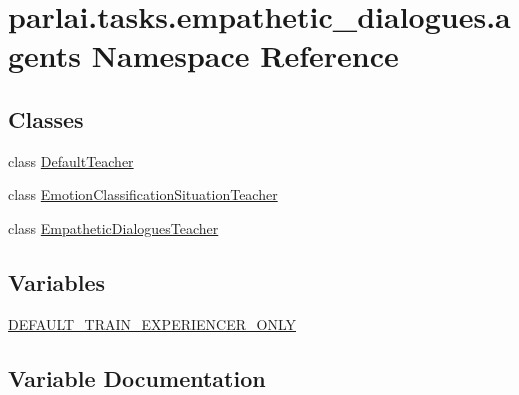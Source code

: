 \hypertarget{namespaceparlai_1_1tasks_1_1empathetic__dialogues_1_1agents}{}\section{parlai.\+tasks.\+empathetic\+\_\+dialogues.\+agents Namespace Reference}
\label{namespaceparlai_1_1tasks_1_1empathetic__dialogues_1_1agents}
\subsection*{Classes}
\begin{DoxyCompactItemize}
\item 
class \hyperlink{classparlai_1_1tasks_1_1empathetic__dialogues_1_1agents_1_1DefaultTeacher}{Default\+Teacher}
\item 
class \hyperlink{classparlai_1_1tasks_1_1empathetic__dialogues_1_1agents_1_1EmotionClassificationSituationTeacher}{Emotion\+Classification\+Situation\+Teacher}
\item 
class \hyperlink{classparlai_1_1tasks_1_1empathetic__dialogues_1_1agents_1_1EmpatheticDialoguesTeacher}{Empathetic\+Dialogues\+Teacher}
\end{DoxyCompactItemize}
\subsection*{Variables}
\begin{DoxyCompactItemize}
\item 
\hyperlink{namespaceparlai_1_1tasks_1_1empathetic__dialogues_1_1agents_a11d5c56abc0e847232f8b22d9a96d6f4}{D\+E\+F\+A\+U\+L\+T\+\_\+\+T\+R\+A\+I\+N\+\_\+\+E\+X\+P\+E\+R\+I\+E\+N\+C\+E\+R\+\_\+\+O\+N\+LY}
\end{DoxyCompactItemize}


\subsection{Variable Documentation}
\mbox{\label{namespaceparlai_1_1tasks_1_1empathetic__dialogues_1_1agents_a11d5c56abc0e847232f8b22d9a96d6f4}} 
